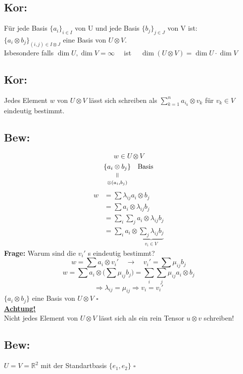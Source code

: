 \documentclass[titlepage,12pt,a4paper,ngerman]{report}
\newenvironment{bew}[1]{\subsection{Bew: #1}}{\hfill$\square$}
\newcommand{\Bew}[2]{\begin{bew}{#1}#2\end{bew}}
\newcommand{\verteq}{\rotatebox{90}{$\,=$}}
\newcommand{\equalto}[2]{\underset{\scriptstyle\overset{\mkern4mu\verteq}{#2}}{#1}}
\newcommand{\tx}[1]{\textrm{#1}}
\begin{document}

\subsection{Kor:}
Für jede Basis $ \{a_i\}_{i\in I} $ von U und jede Basis $ \{b_j\}_{j\in J} $ von V ist: $ \{a_i \otimes b_j\}_{(i,j) \in I \otimes J} $ eine Basis von $ U \otimes V $.\\
Isbesondere falls $ \dim U , \dim V =  \infty \quad $ ist $ \quad \dim (U  \otimes  V) = \dim U  \cdot  \dim V$

\subsection{Kor:}
Jedes Element $ w $ von $ U \otimes V $ lässt sich schreiben als $ \sum_{k=1}^{n} a_{i_k} \otimes v_k $ für $ v_k \in V $ eindeutig bestimmt.

\Bew{}{
$$w \in U \otimes V$$
$$\{\equalto{ a_i \otimes b_j }{\otimes (a_i,b_j)}\} \quad \tx{Basis}$$
\begin{align*}
w &= \sum \lambda_{ij} a_i \otimes b_j\\
&= \sum a_i \otimes \lambda_{ij} b_j\\
&= \sum_i \sum_j a_i \otimes \lambda_{ij} b_j\\
&= \sum_i a_i \otimes \underbrace{\sum_j \lambda_{ij} b_j}_{v_i \in V}
\end{align*}
\textbf{Frage:} Warum sind die $ v_i' $ s eindeutig bestimmt?
$$w = \sum a_i \otimes v_i' \quad \longrightarrow \quad v_i' = \sum \mu_{ij} b_j$$
$$ w = \sum a_i \otimes \Big( \sum \mu_{ij} b_j \Big) = \sum_i \sum_j \mu_{ij} a_i \otimes b_j$$
$$\Rightarrow \lambda_{ij} = \mu_{ij} \Rightarrow v_i = v_i'$$
$ \{ a_i \otimes b_j \} $ eine Basis von $ U \otimes V $
}\\[5pt]
\textbf{\underline{Achtung!}}\\
Nicht jedes Element von $ U \otimes V $ lässt sich als ein rein Tensor $ u \otimes v $ schreiben!

\Bew{}{
$ U = V = \mathbb{R}^2 $ mit der Standartbasis $ \{ e_1, e_2\} $
}
\end{document}
